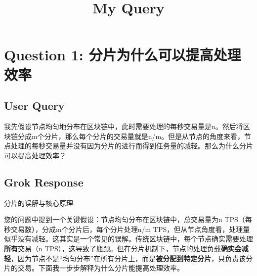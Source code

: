 \documentclass[a4paper,12pt]{ctexart}
\title{My Query}
\author{}
\date{}
\begin{document}
\maketitle
\vspace{-6em}
\section*{Question 1: 分片为什么可以提高处理效率}
\subsection*{User Query}
我先假设节点均匀地分布在区块链中，此时需要处理的每秒交易量是n。然后将区块链分成m个分片，那么每个分片的交易量就是n/m。但是从节点的角度来看，节点处理的每秒交易量并没有因为分片的进行而得到任务量的减轻。那么为什么分片可以提高处理效率？

\subsection*{Grok Response}
分片的误解与核心原理

您的问题中提到一个关键假设：节点均匀分布在区块链中，总交易量为n TPS（每秒交易数），分成m个分片后，每个分片处理n/m TPS，但从节点角度看，处理量似乎没有减轻。这其实是一个常见的误解。传统区块链中，每个节点确实需要处理\textbf{所有}交易（n TPS），这导致了瓶颈。但在分片机制下，节点的处理负载\textbf{确实会减轻}，因为节点不是“均匀分布”在所有分片上，而是\textbf{被分配到特定分片}，只负责该分片的交易。下面我一步步解释为什么分片能提高处理效率。
\end{document}
